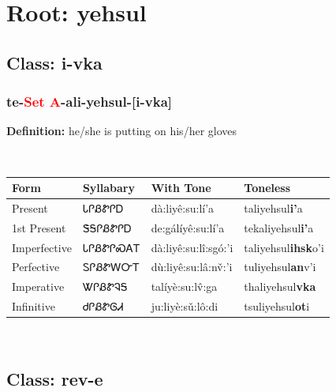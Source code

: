 \needspace{4in}
\section*{Root: yehsul}
\nopagebreak
{}
\needspace{3in}
\subsection*{Class: i-vka}
\nopagebreak
\needspace{2in}
\subsubsection*{te{-}\textcolor{Red}{Set A}{-}ali{-}\textbf{yehsul}{-}[i-vka]}
\nopagebreak
\textbf{Definition: } he/she is putting on his/her gloves
\\[0.5em]
\begin{tabularx}{\textwidth}{l X X X}%
\toprule%
\textbf{Form}&\textbf{Syllabary}&\textbf{With Tone}&\textbf{Toneless}\\%
\midrule%
Present&ᏓᎵᏰᏑᎵᎠ&dà:liyê:su:lí’a&taliyehsul\textbf{i'}a\\%
1st Present&ᏕᎦᎵᏰᏑᎵᎠ&de:gálíyê:su:lí’a&tekaliyehsul\textbf{i'}a\\%
Imperfective&ᏓᎵᏰᏑᎵᏍᎪᎢ&dà:liyê:su:lî:sgó:’i&taliyehsul\textbf{ihsk}o'i\\%
Perfective&ᏚᎵᏰᏑᎳᏅᎢ&dù:liyê:su:lâ:nv̌:’i&tuliyehsul\textbf{an}v'i\\%
Imperative&ᏔᎵᏰᏑᎸᎦ&talíyè:su:lv̂:ga&thaliyehsul\textbf{vka}\\%
Infinitive&ᏧᎵᏰᏑᎶᏗ&ju:liyè:sǔ:lô:di&tsuliyehsul\textbf{ot}i\\%
\bottomrule%
\end{tabularx}
\\[1em]
\needspace{3in}
\subsection*{Class: rev-e}
\nopagebreak
\needspace{2in}
